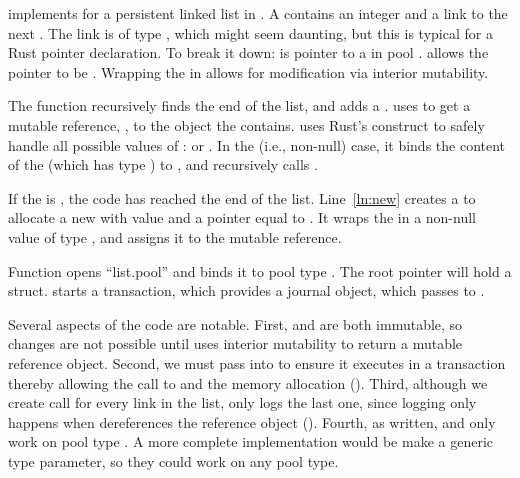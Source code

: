  implements  for a persistent linked list in \this{}.  A  contains an integer and a link to the next .  The link is of type , which might seem daunting, but this is typical for a Rust pointer declaration.  To break it down:  is pointer to a  in pool .   allows the pointer to be .  Wrapping the  in  allows for modification via interior mutability.

The function  recursively finds the end of the list,  and adds a .   uses  to get a mutable reference, , to the  object the  contains.  uses Rust's  construct to safely handle all possible values of :  or .  In the  (i.e., non-null) case, it binds the content of the  (which has type ) to , and recursively calls .

If the  is , the code has reached the end of the list.  Line~\ref{ln:new} creates a  to allocate a new  with value  and a  pointer equal to .  It wraps the  in a non-null value of type , and assigns it to the mutable reference.


Function  opens ``list.pool'' and binds it to pool type .  The root pointer will hold a  struct.   starts a transaction, which provides a journal object, which  passes to .

Several aspects of the code are notable.  First,  and  are both immutable, so changes are not possible until  uses interior mutability to return a mutable reference object.  Second, we must pass  into  to ensure it executes in a transaction thereby allowing the call to   and the memory allocation ().  Third, although we create call  for every link in the list, \this{} only logs the last one, since logging only happens when  dereferences the reference object ().  Fourth, as written,  and  only work on pool type .  A more complete implementation would be make  a generic type parameter, so they could work on any pool type.

